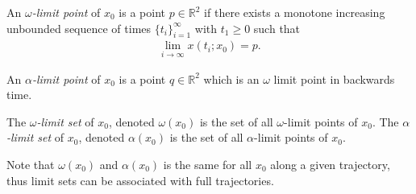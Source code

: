 \begin{definition}
	An \emph{$\omega$-limit point} of $x_0$ is a point $p \in \mathbb{R}^{2}$ if there exists a monotone increasing unbounded sequence of times $\{t_i\}_{i=1}^{\infty}$ with $t_1 \geq 0$ such that 
	\begin{align}
		\lim_{i\to \infty}x(t_i;x_0)=p.
	\end{align}
\end{definition}

\begin{definition}
	An \emph{$\alpha$-limit point} of $x_0$ is a point $q \in \mathbb{R}^{2}$ which is an $\omega $ limit point in backwards time. 
\end{definition}

\begin{definition}
	The \emph{$\omega $-limit set} of $x_0$, denoted $\omega(x_0)$ is the set of all $\omega$-limit points of $x_0$.
	The \emph{$\alpha $-limit set} of $x_0$, denoted $\alpha(x_0)$ is the set of all $\alpha$-limit points of $x_0$.
\end{definition}
\begin{remark}[]
	Note that $\omega(x_0)$ and $\alpha(x_0)$ is the same for all $x_0 $ along a given trajectory, thus limit sets can be associated with full trajectories.
\end{remark}
